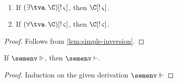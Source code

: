 \documentclass[acmsmall,screen,nonacm,review]{acmart}
\begin{document}
\begin{lemma}
  \label{lem:unicity-inversion}~
  \begin{enumerate}[(\roman*)]
    \item If $\Cshape {\parens{\cexists \tv \C}} \t \sh$, then $\Cshape \C \t \sh$.
    \item If $\Cshape {\parens{\cfor \tv \C}} \t \sh$, then $\Cshape \C \t \sh$.
  \end{enumerate}
  \begin{proof}
    Follows from \cref{lem:simple-inversion}.
  \end{proof}
\end{lemma}

\begin{lemma}[Decanonicalization]
  \label{lem:decanonicalization}
  If $\semenv \Th \c$, then $\semenv \th \c$.
  \begin{proof}
    Induction on the given derivation $\semenv \Th \c$
  \end{proof}
\end{lemma}

\end{document}
